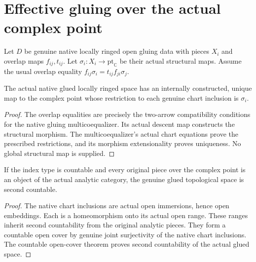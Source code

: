 \section{Effective gluing over the actual complex point}

Let $D$ be genuine native locally ringed open gluing data with pieces
$X_i$ and overlap maps $f_{ij},t_{ij}$. Let
$\sigma_i:X_i\to\mathrm{pt}_{\mathbb C}$ be their actual structural maps.
Assume the usual overlap equality
$f_{ij}\sigma_i=t_{ij}f_{ji}\sigma_j$.

\begin{theorem}
\label{hir:reduced-analytic-glue-complex-structural-map}
The actual native glued locally ringed space has an internally
constructed, unique map to the complex point whose restriction to
each genuine chart inclusion is $\sigma_i$.
\leanok
\end{theorem}
\begin{proof}
The overlap equalities are precisely the two-arrow compatibility
conditions for the native gluing multicoequalizer. Its actual descent
map constructs the structural morphism. The multicoequalizer's actual
chart equations prove the prescribed restrictions, and its morphism
extensionality proves uniqueness. No global structural map is supplied.
\end{proof}

\begin{theorem}
\label{hir:reduced-analytic-glue-second-countable}
If the index type is countable and every original piece over the
complex point is an object of the actual analytic category, the
genuine glued topological space is second countable.
\leanok
\end{theorem}
\begin{proof}
The native chart inclusions are actual open immersions, hence open
embeddings. Each is a homeomorphism onto its actual open range. These
ranges inherit second countability from the original analytic pieces.
They form a countable open cover by genuine joint surjectivity of the
native chart inclusions. The countable open-cover theorem proves
second countability of the actual glued space.
\end{proof}

